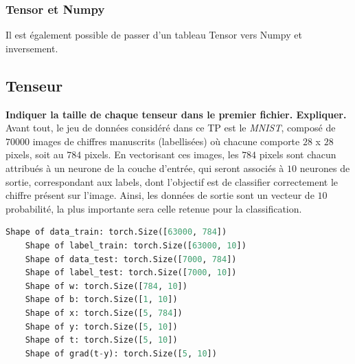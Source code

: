 \documentclass[a4paper]{article}
\begin{document}
		\subsubsection{Tensor et Numpy}
Il est également possible de passer d'un tableau Tensor vers Numpy et inversement. 
		
		\subsection{Tenseur}
\textbf{Indiquer la taille de chaque tenseur dans le premier fichier. Expliquer.}\\

	Avant tout, le jeu de données considéré dans ce TP est le \textit{MNIST}, composé de $70 000$ images de chiffres manuscrits (labellisées) où chacune comporte $28$ x $28$ pixels, soit au $784$ pixels. En vectorisant ces images, les $784$ pixels sont chacun attribués à un neurone de la couche d'entrée, qui seront associés à $10$ neurones de sortie, correspondant aux labels, dont l'objectif est de classifier correctement le chiffre présent sur l'image. Ainsi, les données de sortie sont un vecteur de $10$ probabilité, la plus importante sera celle retenue pour la classification.
		
		\begin{lstlisting}[language=python]
	Shape of data_train: torch.Size([63000, 784])
	Shape of label_train: torch.Size([63000, 10])
	Shape of data_test: torch.Size([7000, 784])
	Shape of label_test: torch.Size([7000, 10])
	Shape of w: torch.Size([784, 10])
	Shape of b: torch.Size([1, 10])
	Shape of x: torch.Size([5, 784])
	Shape of y: torch.Size([5, 10])
	Shape of t: torch.Size([5, 10])
	Shape of grad(t-y): torch.Size([5, 10])
		\end{lstlisting}
\end{document}
